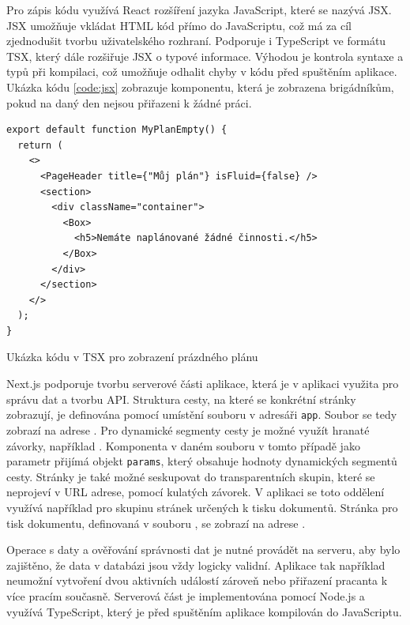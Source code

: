 Pro zápis kódu využívá React rozšíření jazyka JavaScript, které se nazývá JSX. JSX umožňuje vkládat HTML kód přímo do JavaScriptu, což má za cíl
zjednodušit tvorbu uživatelského rozhraní. Podporuje i TypeScript ve formátu TSX, který dále rozšiřuje JSX o typové informace.
Výhodou je kontrola syntaxe a typů při kompilaci, což umožňuje odhalit chyby v kódu před spuštěním aplikace. Ukázka kódu \ref{code:jsx} zobrazuje
komponentu, která je zobrazena brigádníkům, pokud na daný den nejsou přiřazeni k žádné práci.

\begin{listing}[h]
  \begin{verbatim}
export default function MyPlanEmpty() {
  return (
    <>
      <PageHeader title={"Můj plán"} isFluid={false} />
      <section>
        <div className="container">
          <Box>
            <h5>Nemáte naplánované žádné činnosti.</h5>
          </Box>
        </div>
      </section>
    </>
  );
}
    \end{verbatim}
    \caption{Ukázka kódu v TSX pro zobrazení prázdného plánu}
    \label{code:jsx}
\end{listing}

Next.js podporuje tvorbu serverové části aplikace, která je v aplikaci využita pro správu dat a tvorbu API. 
Struktura cesty, na které se konkrétní stránky zobrazují, je definována pomocí umístění souboru v adresáři \texttt{app}.
Soubor  se tedy zobrazí na adrese .
Pro dynamické segmenty cesty je možné využít hranaté závorky, například . Komponenta v daném souboru
v tomto případě jako parametr přijímá objekt \texttt{params}, který obsahuje hodnoty dynamických segmentů cesty.
Stránky je také možné seskupovat do transparentních skupin, které se neprojeví v URL adrese, pomocí kulatých závorek. V aplikaci se toto oddělení využívá 
například pro skupinu stránek určených k tisku dokumentů. Stránka pro tisk dokumentu, definovaná v souboru , se 
zobrazí na adrese .

Operace s daty a ověřování správnosti
dat je nutné provádět na serveru, aby bylo zajištěno, že data v databázi jsou vždy logicky validní. Aplikace tak například neumožní vytvoření
dvou aktivních událostí zároveň nebo přiřazení pracanta k více pracím současně.
Serverová část je implementována pomocí Node.js a využívá TypeScript, který je před spuštěním aplikace kompilován do JavaScriptu.


